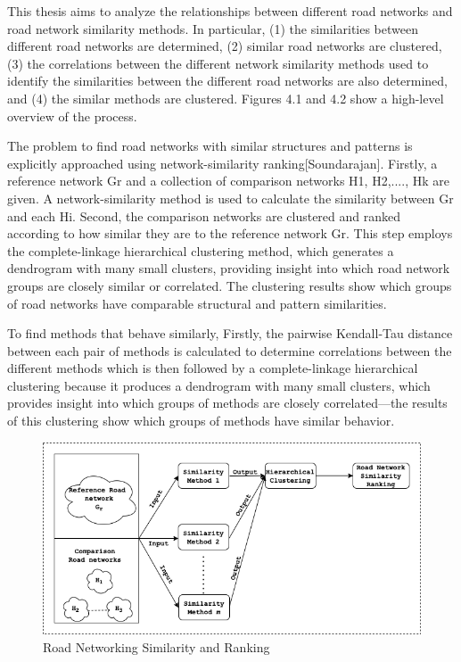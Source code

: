
This thesis aims to analyze the relationships between different road networks and road network similarity methods. In particular,  (1) the similarities between different road networks are determined, (2) similar road networks are clustered, (3) the correlations between the different network similarity methods used to identify the similarities between the different road networks are also determined, and (4) the similar methods are clustered. Figures 4.1 and 4.2 show a high-level overview of the process. 

The problem to find road networks with similar structures and patterns is explicitly approached using network-similarity ranking[Soundarajan]. Firstly, a reference network Gr and a collection of comparison networks H1, H2,...., Hk are given. A network-similarity method is used to calculate the similarity between Gr and each Hi. Second, the comparison networks are clustered and ranked according to how similar they are to the reference network Gr. This step employs the complete-linkage hierarchical clustering method, which generates a dendrogram with many small clusters, providing insight into which road network groups are closely similar or correlated. The clustering results show which groups of road networks have comparable structural and pattern similarities. 

To find methods that behave similarly, Firstly, the pairwise Kendall-Tau distance between each pair of methods is calculated to determine correlations between the different methods which is then followed by a complete-linkage hierarchical clustering because it produces a dendrogram with many small clusters, which provides insight into which groups of methods are closely correlated—the results of this clustering show which groups of methods have similar behavior. 

\begin{figure}[h]
\centering
\includegraphics[width=1.25\textwidth,center]{picture/network_ranking.png}
\caption[Miniaturtrichter]{Road Networking Similarity and Ranking}
\label{fig:network ranking}
\end{figure}

